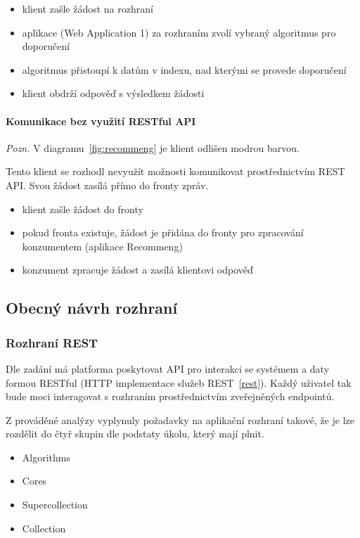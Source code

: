 \documentclass[thesis=M,czech]{FITthesis}[2014/05/07]
\begin{document}
\begin{itemize}
	\item klient zašle žádost na rozhraní
	\item aplikace (Web Application 1) za rozhraním zvolí vybraný algoritmus pro doporučení
	\item algoritmus přistoupí k datům v indexu, nad kterými se provede doporučení
	\item klient obdrží odpověď s výsledkem žádosti
\end{itemize}

\paragraph{Komunikace bez využití RESTful API}

\emph{Pozn.} V diagramu~\ref{fig:recommeng} je klient odlišen modrou barvou.

Tento klient se rozhodl nevyužít možnosti komunikovat prostřednictvím REST API. Svou žádost zasílá přímo do fronty zpráv.

\begin{itemize}
	\item klient zašle žádost do fronty
	\item pokud fronta existuje, žádost je přidána do fronty pro zpracování konzumentem (aplikace Recommeng)
	\item konzument zpracuje žádost a zasílá klientovi odpověď
\end{itemize}

\subsection{Obecný návrh rozhraní}
\label{sec:recommeng}

\subsubsection{Rozhraní REST}
Dle zadání má platforma poskytovat API pro interakci se systémem a daty formou RESTful (HTTP implementace služeb REST~\ref{rest}). Každý uživatel tak bude moci interagovat s rozhraním prostřednictvím zveřejněných endpointů.

Z prováděné analýzy vyplynuly požadavky na aplikační rozhraní takové, že je lze rozdělit do čtyř skupin dle podstaty úkolu, který mají plnit. 

\begin{itemize}
	\item Algorithms
	\item Cores
	\item Supercollection
	\item Collection	
\end{itemize}
\end{document}
